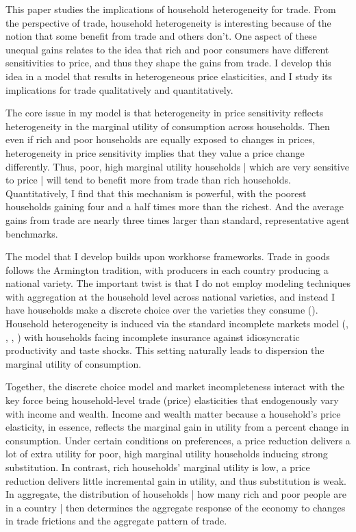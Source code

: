 \documentclass[12pt,pdftex]{article}
\begin{document}
\begin{onehalfspacing}
\hspace{-0.05cm}



\thispagestyle{empty}
\newpage
\normalsize

This paper studies the implications of household heterogeneity for trade. From the perspective of trade, household heterogeneity is interesting because of the notion that some benefit from trade and others don't. One aspect of these unequal gains relates to the idea that rich and poor consumers have different sensitivities to price, and thus they shape the gains from trade.  I develop this idea in a model that results in heterogeneous price elasticities, and I study its implications for trade qualitatively and quantitatively.

The core issue in my model is that heterogeneity in price sensitivity reflects heterogeneity in the marginal utility of consumption across households. Then even if rich and poor households are equally exposed to changes in prices, heterogeneity in price sensitivity implies that they value a price change differently. Thus, poor, high marginal utility households | which are very sensitive to price | will tend to benefit more from trade than rich households. Quantitatively, I find that this mechanism is powerful, with the poorest households gaining four and a half times more than the richest. And the average gains from trade are nearly three times larger than standard, representative agent benchmarks.

The model that I develop builds upon workhorse frameworks. Trade in goods follows the Armington tradition, with producers in each country producing a national variety. The important twist is that I do not employ modeling techniques with aggregation at the household level across national varieties, and instead I have households make a discrete choice over the varieties they consume (\citet{mcfadden1974frontiers}). Household heterogeneity is induced via the standard incomplete markets model (\citet{bewley1979optimum}, \citet{imrohorouglu1989cost}, \citet{huggett1993risk}, \citet{aiyagari1994uninsured}) with households facing incomplete insurance against idiosyncratic productivity and taste shocks. This setting naturally leads to dispersion the marginal utility of consumption.

Together, the discrete choice model and market incompleteness interact with the key force being household-level trade (price) elasticities that endogenously vary with income and wealth. Income and wealth matter because a household's price elasticity, in essence, reflects the marginal gain in utility from a percent change in consumption. Under certain conditions on preferences, a price reduction delivers a lot of extra utility for poor, high marginal utility households inducing strong substitution. In contrast, rich households' marginal utility is low, a price reduction delivers little incremental gain in utility, and thus substitution is weak. In aggregate, the distribution of households | how many rich and poor people are in a country | then determines the aggregate response of the economy to changes in trade frictions and the aggregate pattern of trade.


\end{onehalfspacing}
\end{document}
